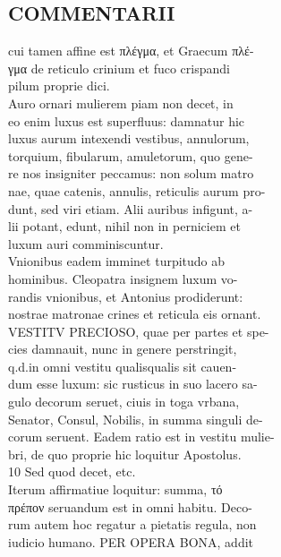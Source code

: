 \documentclass{article}
\begin{document}
\begin{pages}
\section*{COMMENTARII \\
                }cui tamen affine est πλέγμα, et Graecum πλέ- \\
                γμα de reticulo crinium et fuco crispandi \\
                pilum proprie dici. \\
                Auro ornari mulierem piam non decet, in \\
                eo enim luxus est superfluus: damnatur hic \\
                luxus aurum intexendi vestibus, annulorum, \\
                torquium, fibularum, amuletorum, quo gene- \\
                re nos insigniter peccamus: non solum matro \\
                nae, quae catenis, annulis, reticulis aurum pro- \\
                dunt, sed viri etiam. Alii auribus infigunt, a- \\
                lii potant, edunt, nihil non in perniciem et \\
                luxum auri comminiscuntur. \\
                Vnionibus eadem imminet turpitudo ab \\
                hominibus. Cleopatra insignem luxum vo- \\
                randis vnionibus, et Antonius prodiderunt: \\
                nostrae matronae crines et reticula eis ornant. \\
                VESTITV PRECIOSO, quae per partes et spe- \\
                cies damnauit, nunc in genere perstringit, \\
                q.d.in omni vestitu qualisqualis sit cauen- \\
                dum esse luxum: sic rusticus in suo lacero sa- \\
                gulo decorum seruet, ciuis in toga vrbana, \\
                Senator, Consul, Nobilis, in summa singuli de- \\
                corum seruent. Eadem ratio est in vestitu mulie- \\
                bri, de quo proprie hic loquitur Apostolus. \\
                10 Sed quod decet, etc. \\
                Iterum affirmatiue loquitur: summa, τό \\
                πρέπον seruandum est in omni habitu. Deco- \\
                rum autem hoc regatur a pietatis regula, non \\
                iudicio humano. PER OPERA BONA, addit \\
                

\end{pages}
\end{document}
